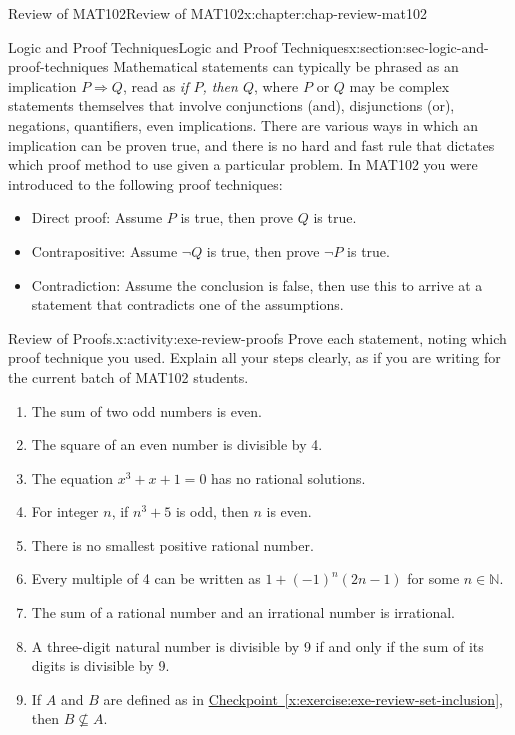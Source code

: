 \documentclass[oneside,10pt,]{book}
\newcommand{\xreffont}{\relax}
\numberwithin{equation}{section}
\begin{document}
\begin{chapterptx}{Review of MAT102}{}{Review of MAT102}{}{}{x:chapter:chap-review-mat102}
\begin{sectionptx}{Logic and Proof Techniques}{}{Logic and Proof Techniques}{}{}{x:section:sec-logic-and-proof-techniques}
Mathematical statements can typically be phrased as an implication \(P \Rightarrow Q\),  read as \emph{if \(P\), then \(Q\)}, where \(P\) or \(Q\) may be complex statements themselves that involve conjunctions (and), disjunctions (or), negations, quantifiers, even implications. There are various ways in which an implication can be proven true, and there is no hard and fast rule that dictates which proof method to use given a particular problem. In MAT102 you were introduced to the following proof techniques:%
\par
%
\begin{itemize}[label=\textbullet]
\item{}Direct proof: Assume \(P\) is true, then prove \(Q\) is true.%
\item{}Contrapositive: Assume \(\neg Q\) is true, then prove \(\neg P\) is true.%
\item{}Contradiction: Assume the conclusion is false, then use this to arrive at a statement that contradicts one of the assumptions.%
\end{itemize}
%
\begin{activity}{Review of Proofs.}{x:activity:exe-review-proofs}%
Prove each statement, noting which proof technique you used. Explain all your steps clearly, as if you are writing for the current batch of MAT102 students.%
\begin{enumerate}[label=(\alph*)]
\item{}The sum of two odd numbers is even.%
\item{}The square of an even number is divisible by 4.%
\item{}The equation \(x^3 + x + 1 = 0\) has no rational solutions.%
\item{}For integer \(n\), if \(n^3 + 5\) is odd, then \(n\) is even.%
\item{}There is no smallest positive rational number.%
\item{}Every multiple of 4 can be written as \(1 + (-1)^n(2n-1)\) for some \(n \in \mathbb{N}\).%
\item{}The sum of a rational number and an irrational number is irrational.%
\item{}A three-digit natural number is divisible by 9 if and only if the sum of its digits is divisible by 9.%
\item{}If \(A\) and \(B\) are defined as in \hyperref[x:exercise:exe-review-set-inclusion]{Checkpoint~{\xreffont\ref{x:exercise:exe-review-set-inclusion}}}, then \(B \not\subseteq A\).%
\end{enumerate}

\end{activity}
\end{sectionptx}
\end{chapterptx}
\end{document}
